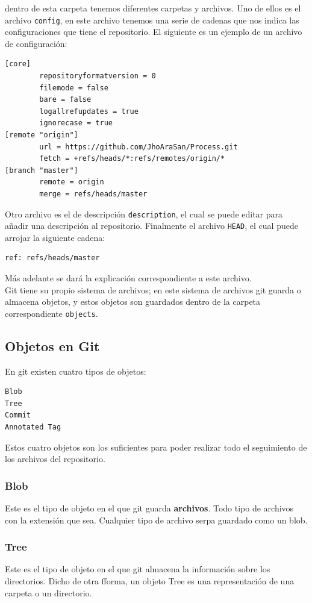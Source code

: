 dentro de esta carpeta tenemos diferentes carpetas y archivos. Uno de ellos es el archivo \texttt{config}, en este archivo tenemos una serie de cadenas que nos indica las configuraciones que tiene el repositorio. El siguiente es un ejemplo de un archivo de configuración:
\begin{verbatim}
[core]
        repositoryformatversion = 0
        filemode = false
        bare = false
        logallrefupdates = true
        ignorecase = true
[remote "origin"]
        url = https://github.com/JhoAraSan/Process.git
        fetch = +refs/heads/*:refs/remotes/origin/*
[branch "master"]
        remote = origin
        merge = refs/heads/master
\end{verbatim}

Otro archivo es el de descripción \texttt{description}, el cual se puede editar para añadir una descripción al repositorio. Finalmente el archivo \texttt{HEAD}, el cual puede arrojar la siguiente cadena:
\begin{verbatim}
ref: refs/heads/master
\end{verbatim}
Más adelante se dará la explicación correspondiente a este archivo. \\
 Git tiene su propio sistema de archivos; en este sistema de archivos git guarda o almacena objetos, y estos objetos son guardados dentro de la carpeta correspondiente \texttt{objects}.

 \subsection{Objetos en Git}

 En git existen cuatro tipos de objetos:
 \begin{verbatim}
Blob
Tree
Commit
Annotated Tag

 \end{verbatim}
Estos cuatro objetos son los suficientes para poder realizar todo el seguimiento de los archivos del repositorio.
\subsubsection{Blob}
Este es el tipo de objeto en el que git guarda \textbf{archivos}. Todo tipo de archivos con la extensión que sea. Cualquier tipo de archivo serpa guardado como un blob. 
\subsubsection{Tree}
Este es el tipo de objeto en el que git almacena la información sobre los directorios. Dicho de otra fforma, un objeto Tree es una representación de una carpeta o un directorio.
